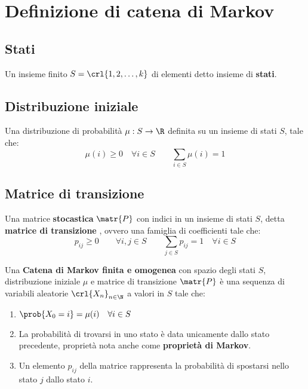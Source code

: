 \documentclass[\main/main.tex]{subfiles}
\begin{document}
\section{Definizione di catena di Markov}
\subsection{Stati}
\begin{definition}[Stati]
  Un insieme finito \(S = \crl{1,2,\ldots, k}\) di elementi detto insieme di \textbf{stati}.
\end{definition}

\subsection{Distribuzione iniziale}
\begin{definition}
  Una distribuzione di probabilità \(\mu: S \rightarrow \R \) definita su un insieme di stati \(S\), tale che:
  \[
    \mu(i) \geq 0 \quad \forall i \in S \qquad \sum_{i \in S} \mu(i) = 1
  \]
\end{definition}

\subsection{Matrice di transizione}
\begin{definition}
  Una matrice \textbf{stocastica} \(\matr{P}\) con indici in un insieme di stati \(S\), detta \textbf{matrice di transizione} , ovvero una famiglia di coefficienti tale che:
  \[
    p_{ij} \geq 0 \qquad \forall i,j \in S \qquad \sum_{j \in S} p_{ij} = 1 \quad \forall i \in S
  \]
\end{definition}

\begin{definition}
  Una \textbf{Catena di Markov finita e omogenea} con spazio degli stati \(S\), distribuzione iniziale \(\mu \) e matrice di transizione \(\matr{P}\) è una sequenza di variabili aleatorie \(\crl{X_n}_{n \in \N}\) a valori in \(S\) tale che:
  \begin{enumerate}
    \item \(\prob{X_0 = i} = \mu(i) \quad \forall i \in S\)
    \item La probabilità di trovarsi in uno stato è data unicamente dallo stato precedente, proprietà nota anche come \textbf{proprietà di Markov}.
    \item Un elemento \(p_{ij}\) della matrice rappresenta la probabilità di spostarsi nello stato \(j\) dallo stato \(i\).
  \end{enumerate}
\end{definition}
\end{document}
